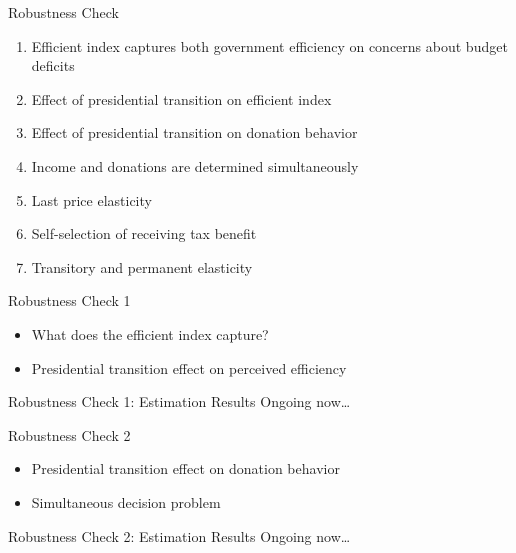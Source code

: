 \documentclass[
  ignorenonframetext,
]{beamer}
\providecommand{\tightlist}{%
  \setlength{\itemsep}{0pt}\setlength{\parskip}{0pt}}
\begin{document}
\begin{frame}{Robustness Check}
\protect\hypertarget{robustness-check-3}{}
\begin{enumerate}
\tightlist
\item
  Efficient index captures both government efficiency on concerns about
  budget deficits
\item
  Effect of presidential transition on efficient index
\item
  Effect of presidential transition on donation behavior
\item
  Income and donations are determined simultaneously
\item
  Last price elasticity
\item
  Self-selection of receiving tax benefit
\item
  Transitory and permanent elasticity
\end{enumerate}
\end{frame}

\begin{frame}{Robustness Check 1}
\protect\hypertarget{robustness-check-1-1}{}
\begin{itemize}
\tightlist
\item
  What does the efficient index capture?
\item
  Presidential transition effect on perceived efficiency
\end{itemize}
\end{frame}

\begin{frame}{Robustness Check 1: Estimation Results}
\protect\hypertarget{robustness-check-1-estimation-results}{}
Ongoing now\ldots{}
\end{frame}

\begin{frame}{Robustness Check 2}
\protect\hypertarget{robustness-check-2-2}{}
\begin{itemize}
\tightlist
\item
  Presidential transition effect on donation behavior
\item
  Simultaneous decision problem
\end{itemize}
\end{frame}

\begin{frame}{Robustness Check 2: Estimation Results}
\protect\hypertarget{robustness-check-2-estimation-results}{}
Ongoing now\ldots{}
\end{frame}
\end{document}
